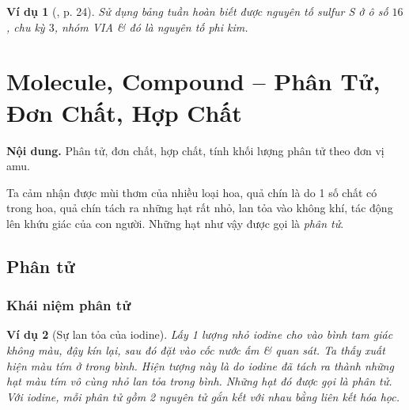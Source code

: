 \documentclass{article}
\newtheorem{vidu}{Ví dụ}
\begin{document}
\begin{vidu}[\cite{SGK_KHTN_7_Canh_Dieu}, p. 24]
	Sử dụng bảng tuần hoàn biết được nguyên tố sulfur \emph{S} ở ô số $16$, chu kỳ $3$, nhóm VIA \& đó là nguyên tố phi kim.
\end{vidu}
\noindent{}


\section{Molecule, Compound -- Phân Tử, Đơn Chất, Hợp Chất}
\textsf{\textbf{Nội dung.} Phân tử, đơn chất, hợp chất, tính khối lượng phân tử theo đơn vị amu.}

Ta cảm nhận được mùi thơm của nhiều loại hoa, quả chín là do 1 số chất có trong hoa, quả chín tách ra những hạt rất nhỏ, lan tỏa vào không khí, tác động lên khứu giác của con người. Những hạt như vậy được gọi là \textit{phân tử}.

\subsection{Phân tử}

\subsubsection{Khái niệm phân tử}

\begin{vidu}[Sự lan tỏa của iodine]
	Lấy 1 lượng nhỏ iodine cho vào bình tam giác không màu, đậy kín lại, sau đó đặt vào cốc nước ấm \& quan sát. Ta thấy xuất hiện màu tím ở trong bình. Hiện tượng này là do iodine đã tách ra thành những hạt màu tím vô cùng nhỏ lan tỏa trong bình. Những hạt đó được gọi là phân tử. Với iodine, mỗi phân tử gồm 2 nguyên tử gắn kết với nhau bằng liên kết hóa học.
\end{vidu}
\end{document}
